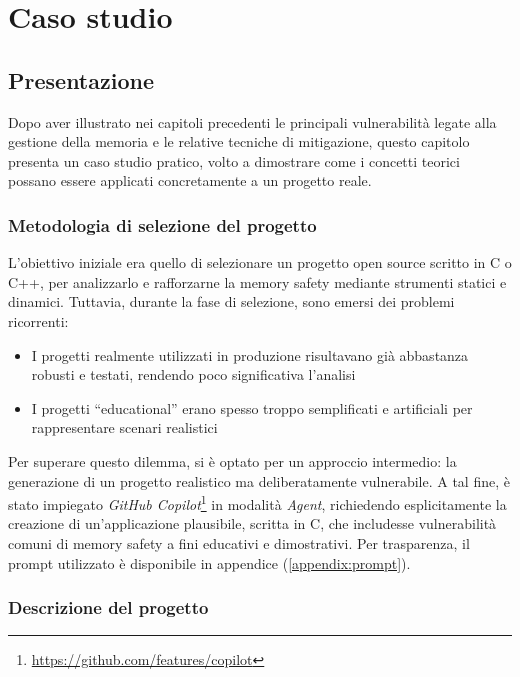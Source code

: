 \chapter{Caso studio}
\label{chap:real_case}

\section{Presentazione}
\label{sec:presentation}

Dopo aver illustrato nei capitoli precedenti le principali vulnerabilità legate alla
gestione della memoria e le relative tecniche di mitigazione, questo capitolo
presenta un caso studio pratico, volto a dimostrare come i concetti teorici possano
essere applicati concretamente a un progetto reale.

\subsection*{Metodologia di selezione del progetto}

L'obiettivo iniziale era quello di selezionare un progetto open source scritto
in C o C++, per analizzarlo e rafforzarne la memory safety mediante strumenti statici
e dinamici. Tuttavia, durante la fase di selezione, sono emersi dei problemi
ricorrenti:
\begin{itemize}
  \item I progetti realmente utilizzati in produzione risultavano già abbastanza
    robusti e testati, rendendo poco significativa l'analisi

  \item I progetti ``educational'' erano spesso troppo semplificati e artificiali
    per rappresentare scenari realistici
\end{itemize}

Per superare questo dilemma, si è optato per un approccio intermedio: la
generazione di un progetto realistico ma deliberatamente vulnerabile. A tal fine,
è stato impiegato \textit{GitHub Copilot}\footnote{\url{https://github.com/features/copilot}}
in modalità \textit{Agent}, richiedendo esplicitamente la creazione di un'applicazione
plausibile, scritta in C, che includesse vulnerabilità comuni di memory safety a
fini educativi e dimostrativi. Per trasparenza, il prompt utilizzato è
disponibile in appendice (\autoref{appendix:prompt}).

\subsection*{Descrizione del progetto}

